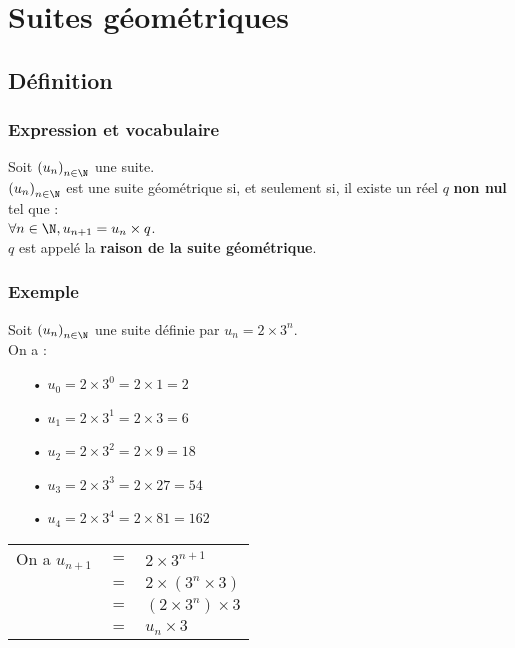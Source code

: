 \ifdefined\COMPLETE
\else
    
    
\fi

\section{Suites géométriques}

\subsection{Définition}

\subsubsection{Expression et vocabulaire}

Soit $\left(u_n\right)_{n \in \N}$ une suite. \\

$\left(u_n\right)_{n \in \N}$ est une suite géométrique si, et seulement si, il existe un réel $q$ \textbf{non nul} tel que : \\
$\forall n \in \N, u_{n+1} = u_n \times q$. \\

$q$ est appelé la \textbf{raison de la suite géométrique}. 

\subsubsection{Exemple}
Soit $\left(u_n\right)_{n \in \N}$ une suite définie par $u_n = 2 \times 3^n$. \\

On a : 

\begin{itemize}
\item[•] $u_0 = 2 \times 3^0 = 2 \times 1 = 2$
\item[•] $u_1 = 2 \times 3^1 = 2 \times 3 = 6$
\item[•] $u_2 = 2 \times 3^2 = 2 \times 9 = 18$
\item[•] $u_3 = 2 \times 3^3 = 2 \times 27 = 54$
\item[•] $u_4 = 2 \times 3^4 = 2 \times 81 = 162$
\end{itemize}

\vspace*{.3cm}

\begin{tabular}{lll}
On a $u_{n+1}$ & $ = $ & $ 2 \times 3^{n+1}$ \\
& $=$ & $2 \times \left(3^n \times 3\right)$ \\
& $=$ & $\left(2 \times 3^n\right) \times 3$ \\
& $=$ & $u_n \times 3$ \\
\end{tabular}

